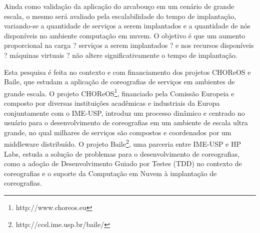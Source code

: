 Ainda como validação da aplicação do arcabouço em um cenário de grande escala, o mesmo será avaliado pela escalabilidade do tempo de implantação, variando-se a quantidade de serviços a serem implantados e a quantidade de nós disponíveis no ambiente computação em nuvem. O objetivo é que um aumento proporcional na carga ? serviços a serem implantados ? e nos recursos disponíveis ? máquinas virtuais ? não altere significativamente o tempo de implantação.

Esta pesquisa é feita no contexto e com financiamento dos projetos CHOReOS e Baile, que estudam a aplicação de coreografias de serviços em ambientes de grande escala. O projeto CHOReOS\footnote{http://www.choreos.eu}, financiado pela Comissão Europeia e composto por diversas instituições acadêmicas e industriais da Europa conjuntamente com o IME-USP, introduz um processo dinâmico e centrado no usuário para o desenvolvimento de coreografias em um ambiente de escala ultra grande, no qual milhares de serviços são compostos e coordenados por um middleware distribuído. O projeto Baile\footnote{http://ccsl.ime.usp.br/baile/}, uma parceria entre IME-USP e HP Labs, estuda a solução de problemas para o desenvolvimento de coreografias, como a adoção de Desenvolvimento Guiado por Testes (TDD) no contexto de coreografias e o suporte da Computação em Nuvem à implantação de coreografias.




%
%
%
%
